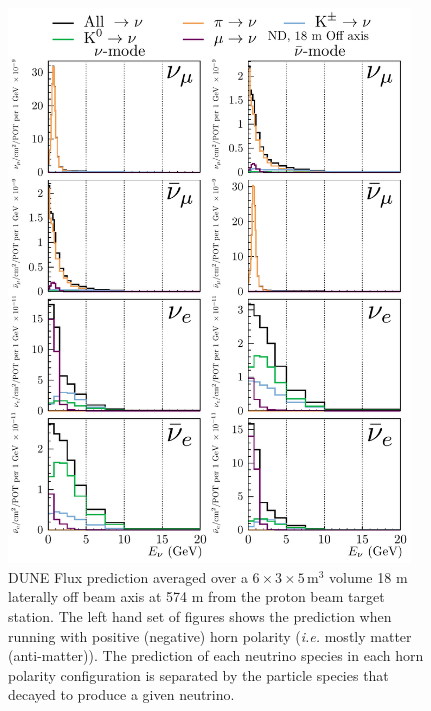 \documentclass{article}
\begin{document}
\begin{figure}
  \centering
  \includegraphics[width=0.95\textwidth]{plots/fluxpredcompvar/ND_HadronParentFluxComponents_18m_offaxis}
  \caption{DUNE Flux prediction averaged over a $6\times 3\times 5\,\textrm{m}^{3}$ volume 18 m laterally off beam axis at 574 m from the proton beam target station. The left hand set of figures shows the prediction when running with positive (negative) horn polarity (\textit{i.e.} mostly matter (anti-matter)). The prediction of each neutrino species in each horn polarity configuration is separated by the particle species that decayed to produce a given neutrino.}
\end{figure}
\end{document}
